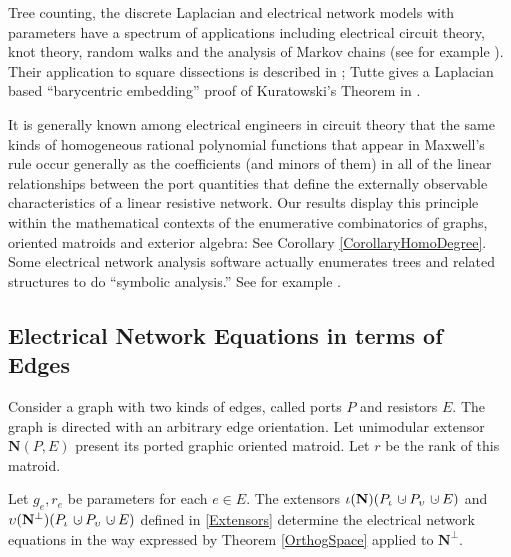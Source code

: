 \documentclass[12pt]{article}
\theoremstyle{definition}
\newcommand{\dunion}
{\mbox{\hbox{\hskip6pt$\cdot$\hskip-5.50pt$\cup$\hskip2pt}}}
\newcommand{\Is}{\ensuremath{\iota}}
\newcommand{\Vs}{\ensuremath{\upsilon}}
\newcommand{\ext}[1]{\ensuremath{\mathbf{#1}}}
\begin{document}
Tree counting, the discrete Laplacian and electrical network models
with parameters 
have a spectrum of applications including  electrical circuit theory,
knot theory, random walks and the analysis of Markov chains
(see for example
\cite{DoyleSnellRandom,BiggsAlgPotTheory,ChungYaoCovHeatKer,ChungYaoGreens}).
Their application to square dissections
is described in \cite{BSST,TutteBook}; Tutte gives a Laplacian based 
``barycentric embedding'' proof
of Kuratowski's Theorem in \cite{HowToDraw}.

It is generally known among electrical engineers in circuit theory
that the same kinds of homogeneous rational polynomial functions that appear
in Maxwell's rule occur generally as the coefficients (and 
minors of them) in all of the 
linear relationships between the port quantities that define the
externally observable characteristics of a linear resistive network.
Our results display this principle within the mathematical contexts of 
the enumerative combinatorics of graphs, oriented matroids and 
exterior algebra: See Corollary \ref{CorollaryHomoDegree}.
Some electrical network analysis software actually enumerates trees and related
structures to do ``symbolic analysis.''
See for example 
\cite{TraWilBilinear,ThulasiramanSwamyBook,someEEBooks,sdcISCAS98}.  

\subsection{Electrical Network Equations in terms of Edges}
\label{ElecNetEquatSec}
Consider a graph with two kinds of edges, called ports $P$ and
resistors $E$.  The graph is directed with an arbitrary edge 
orientation.  Let unimodular extensor $\ext{N}(P,E)$ present
its ported graphic oriented matroid.  Let $r$ be the rank of
this matroid.

Let $g_e,r_e$ be parameters for each $e\in E$.  The extensors
$\Is(\ext{N})(P_\Is\dunion P_\Vs\dunion E)$
and 
$\Vs(\ext{N}^\perp)(P_\Is\dunion P_\Vs\dunion E)$ defined in \textsection
\ref{Extensors} determine the electrical network equations in the
way expressed by Theorem \ref{OrthogSpace} applied to $\ext{N}^\perp$.
\end{document}
